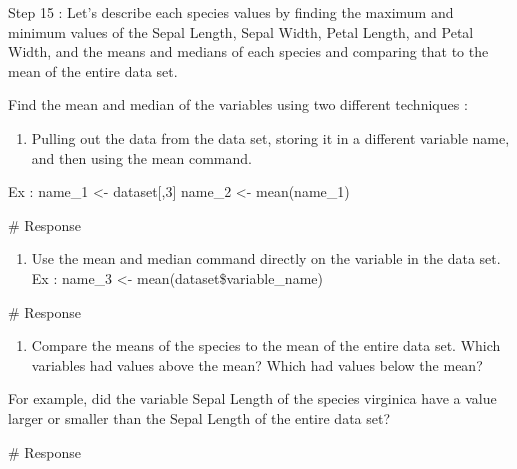 \documentclass[
  letterpaper,
  DIV=11,
  numbers=noendperiod]{scrreprt}
\newenvironment{Shaded}{\begin{snugshade}}{\end{snugshade}}
\newcommand{\CommentTok}[1]{\textcolor[rgb]{0.37,0.37,0.37}{#1}}
\providecommand{\tightlist}{%
  \setlength{\itemsep}{0pt}\setlength{\parskip}{0pt}}\usepackage{longtable,booktabs,array}
\begin{document}
Step 15 : Let's describe each species values by finding the maximum and
minimum values of the Sepal Length, Sepal Width, Petal Length, and Petal
Width, and the means and medians of each species and comparing that to
the mean of the entire data set.

Find the mean and median of the variables using two different techniques
:

\begin{enumerate}
\def\labelenumi{(\alph{enumi})}
\tightlist
\item
  Pulling out the data from the data set, storing it in a different
  variable name, and then using the mean command.
\end{enumerate}

Ex : name\_1 \textless- dataset{[},3{]} name\_2 \textless- mean(name\_1)

\begin{Shaded}
\begin{Highlighting}[]
\CommentTok{\# Response}
\end{Highlighting}
\end{Shaded}

\begin{enumerate}
\def\labelenumi{(\alph{enumi})}
\setcounter{enumi}{1}
\tightlist
\item
  Use the mean and median command directly on the variable in the data
  set. Ex : name\_3 \textless- mean(dataset\$variable\_name)
\end{enumerate}

\begin{Shaded}
\begin{Highlighting}[]
\CommentTok{\# Response}
\end{Highlighting}
\end{Shaded}

\begin{enumerate}
\def\labelenumi{(\alph{enumi})}
\setcounter{enumi}{2}
\tightlist
\item
  Compare the means of the species to the mean of the entire data set.
  Which variables had values above the mean? Which had values below the
  mean?
\end{enumerate}

For example, did the variable Sepal Length of the species virginica have
a value larger or smaller than the Sepal Length of the entire data set?

\begin{Shaded}
\begin{Highlighting}[]
\CommentTok{\# Response}
\end{Highlighting}
\end{Shaded}
\end{document}
